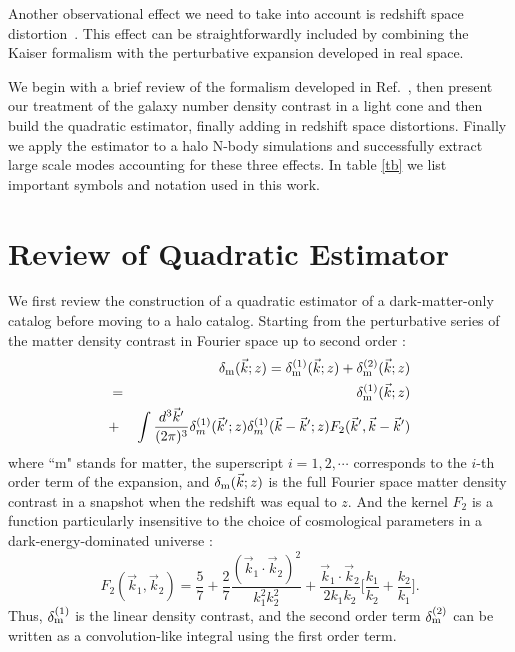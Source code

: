 \documentclass[prd,amsmath,amssymb,floatfix,superscriptaddress,nofootinbib,twocolumn]{revtex4-1}
\def\be{\begin{equation}}
\def\ee{\end{equation}}
\def\bea{\begin{eqnarray}}
\def\eea{\end{eqnarray}}
\newcommand{\vrr}{\vec{r}}
\newcommand{\vs}{\nonumber\\}
\newcommand{\vk}{\vec{k}}
\newcommand{\eql}[1]{\label{eq:#1}}
\begin{document}
Another observational effect we need to take into account is redshift space distortion~\cite{Kaiser:1987rsd}. This effect can be straightforwardly included by combining the Kaiser formalism with the perturbative expansion developed in real space.

We begin with a brief review of the formalism developed in Ref.~\cite{Li:2020fir}, then present our treatment of the galaxy number density contrast in a light cone and then build the quadratic estimator, finally adding in redshift space distortions. Finally we apply the estimator to a halo N-body simulations and successfully extract large scale modes accounting for these three effects. In table \ref{tb} we list important symbols and notation used in this work.
\clearpage


\section{Review of Quadratic Estimator} \label{sec2}

\noindent We first review the construction of a quadratic estimator of a dark-matter-only catalog \cite{Li:2020fir} before moving to a halo catalog. Starting from the perturbative series of the matter density contrast in Fourier space up to second order \cite{Jain:1994sop}\cite{Bernardeau:2002rev}:
\bea
&&\delta_{\rm m}(\vk;z)=\delta^{(1)}_{\rm m}(\vk;z)+\delta^{(2)}_{\rm m}(\vk;z)\vs
&=&\delta^{(1)}_{\rm m}(\vk;z)\vs
&+&\int \frac{d^{3}\vec{k}'}{(2\pi)^3}\delta^{(1)}_{m}(\vec{k}';z)\delta^{(1)}_{m}(\vec{k}-\vec{k}';z){F}_{2}(\vec{k}',\vec{k}-\vec{k}') \eql{tayl}
\eea 
where ``m" stands for matter, the superscript $i=1,2,\cdots$ corresponds to the $i$-th order term of the expansion, and $\delta_{\rm m}(\vk;z)$ is the full Fourier space matter density contrast in a snapshot when the redshift was equal to $z$. And the kernel $F_{2}$ is a function particularly insensitive to the choice of cosmological parameters in a dark-energy-dominated universe \cite{Takahashi:2008to}:
\be
F_{2}(\vk_1,\vk_2)=\frac{5}{7}+\frac{2}{7}\frac{(\vk_1\cdot \vk_2)^2}{k_1^2 k_2^2}+\frac{\vk_1\cdot \vk_2}{2k_1k_2}\bigg[\frac{k_1}{k_2}+\frac{k_2}{k_1}\bigg].\eql{f2}
\ee
Thus, $\delta_{\rm m}^{(1)}$ is the linear density contrast, and the second order term $\delta_{\rm m}^{(2)}$ can be written as a convolution-like integral using the first order term.
\end{document}
